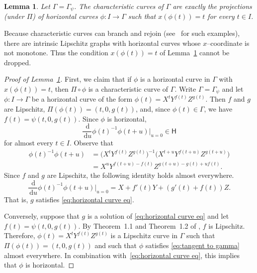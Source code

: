 \documentclass[11pt,reqno]{amsart}
\renewcommand{\H}{\mathbb{H}}
\newcommand{\R}{\mathbb{R}}
\newcommand{\ud}[0]{\,\mathrm{d}}
\newcommand{\0}{\mathbf{0}}
\renewcommand{\1}{\mathbf 1}
\newcommand{\from}{\colon}
\renewcommand{\subset}{\subseteq}
\newtheorem{lemma}[thm]{Lemma}
\theoremstyle{remark}
\begin{document}
\begin{lemma}\label{lem:char}
  Let $\Gamma=\Gamma_\psi$.  The characteristic curves of $\Gamma$ are exactly the projections (under $\Pi$) of horizontal curves $\phi\from I\to \Gamma$ such that $x(\phi(t))=t$ for every $t\in I$.
\end{lemma}
Because characteristic curves can branch and rejoin (see~\cite{BigolinCaravennaSerraCassano} for such examples), there are intrinsic Lipschitz graphs with horizontal curves whose $x$--coordinate is not monotone.  Thus the condition $x(\phi(t))=t$ of Lemma~\ref{lem:char} cannot be dropped.
\begin{proof}[Proof of Lemma~\ref{lem:char}]

  First, we claim that if $\phi$ is a horizontal curve in $\Gamma$ with $x(\phi(t))=t$, then $\Pi\circ \phi$ is a characteristic curve of $\Gamma$.
  Write $\Gamma=\Gamma_\psi$ and let $\phi\from I\to \Gamma$ be a horizontal curve of the form $\phi(t)=X^t Y^{f(t)}Z^{g(t)}$.  Then $f$ and $g$ are Lipschitz, $\Pi(\phi(t))=(t,0,g(t))$, and, since $\phi(t)\in \Gamma$, we have $f(t)=\psi(t,0,g(t))$.  Since $\phi$ is horizontal,
  $$\frac{\ud}{\ud u} \phi(t)^{-1} \phi(t+u)\bigg|_{u=0}\in \mathsf{H}$$
  for almost every $t\in I$.  Observe that
  \begin{align*}
    \phi(t)^{-1} \phi(t+u)
    &=\bigl(X^{t}Y^{f(t)}Z^{g(t)}\bigr)^{-1} \bigl(X^{t+u}Y^{f(t+u)}Z^{g(t+u)}\bigr) \\
    &=X^{u}Y^{f(t+u)-f(t)}Z^{g(t+u)-g(t)+u f(t)}.
  \end{align*}
  Since $f$ and $g$ are Lipschitz, the following identity holds almost everywhere.
  \begin{equation}\label{eq:tangent to gamma}
    \frac{\ud}{\ud u} \phi(t)^{-1} \phi(t+u)\bigg|_{u=0}=X+f'(t) Y+(g'(t)+f(t))Z.
  \end{equation}
  That is, $g$ satisfies \eqref{eq:horizontal curve eq}.

  Conversely, suppose that $g$ is a solution of \eqref{eq:horizontal curve eq} and let $f(t)=\psi(t,0,g(t))$.  By Theorem~1.1 and Theorem~1.2 of \cite{BigolinCaravennaSerraCassano}, $f$ is Lipschitz.  Therefore, $\phi(t)=X^t Y^{f(t)}Z^{g(t)}$ is a Lipschitz curve in $\Gamma$ such that $\Pi(\phi(t))=(t,0,g(t))$ and such that $\phi$ satisfies \eqref{eq:tangent to gamma} almost everywhere.  In combination with~\eqref{eq:horizontal curve eq}, this implies that $\phi$ is horizontal.
\end{proof}
\end{document}
